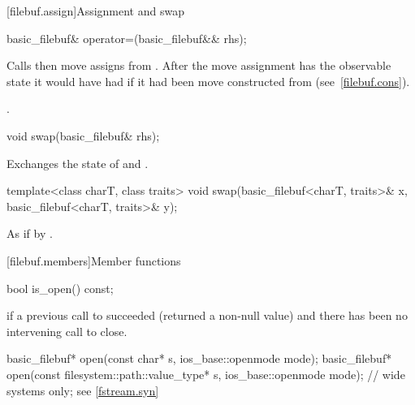 [filebuf.assign]{Assignment and swap}

%
\begin{itemdecl}
basic_filebuf& operator=(basic_filebuf&& rhs);
\end{itemdecl}

\begin{itemdescr}
\pnum
\effects Calls  then move assigns from . After the
move assignment  has the observable state it would have had if it
had been move constructed from  (see~\ref{filebuf.cons}).

\pnum
\returns {}.
\end{itemdescr}

%
\begin{itemdecl}
void swap(basic_filebuf& rhs);
\end{itemdecl}

\begin{itemdescr}
\pnum
\effects Exchanges the state of 
and .
\end{itemdescr}

%
\begin{itemdecl}
template<class charT, class traits>
  void swap(basic_filebuf<charT, traits>& x,
            basic_filebuf<charT, traits>& y);
\end{itemdecl}

\begin{itemdescr}
\pnum
\effects As if by .
\end{itemdescr}

[filebuf.members]{Member functions}

%
\begin{itemdecl}
bool is_open() const;
\end{itemdecl}

\begin{itemdescr}
\pnum
\returns
{}
if a previous call to
succeeded (returned a non-null value) and there has been no intervening
call to close.
\end{itemdescr}

%
\begin{itemdecl}
basic_filebuf* open(const char* s, ios_base::openmode mode);
basic_filebuf* open(const filesystem::path::value_type* s,
                    ios_base::openmode mode);  // wide systems only; see \ref{fstream.syn}
\end{itemdecl}

